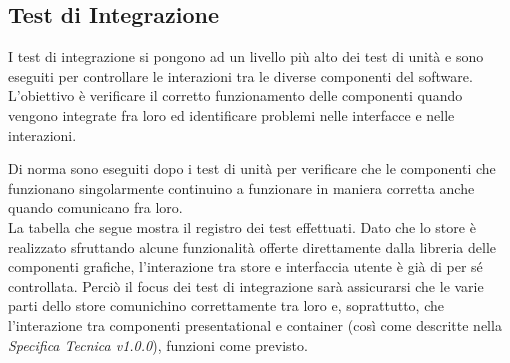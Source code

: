 \subsection{Test di Integrazione}
\par I test di integrazione si pongono ad un livello più alto dei test di unità e sono eseguiti per controllare le interazioni tra le diverse componenti del software. L'obiettivo è verificare il corretto funzionamento delle componenti quando vengono integrate fra loro ed identificare problemi nelle interfacce e nelle interazioni.
\par Di norma sono eseguiti dopo i test di unità per verificare che le componenti che funzionano singolarmente continuino a funzionare in maniera corretta anche quando comunicano fra loro.
\vspace{0.5cm} \\ La tabella che segue mostra il registro dei test effettuati. Dato che lo store è realizzato sfruttando alcune funzionalità offerte direttamente dalla libreria delle componenti grafiche, l'interazione tra store e interfaccia utente è già di per sé controllata. Perciò il focus dei test di integrazione sarà assicurarsi che le varie parti dello store comunichino correttamente tra loro e, soprattutto, che l'interazione tra componenti presentational e container (così come descritte nella \textit{Specifica Tecnica v1.0.0}), funzioni come previsto.
\renewcommand{\arraystretch}{1.5}

